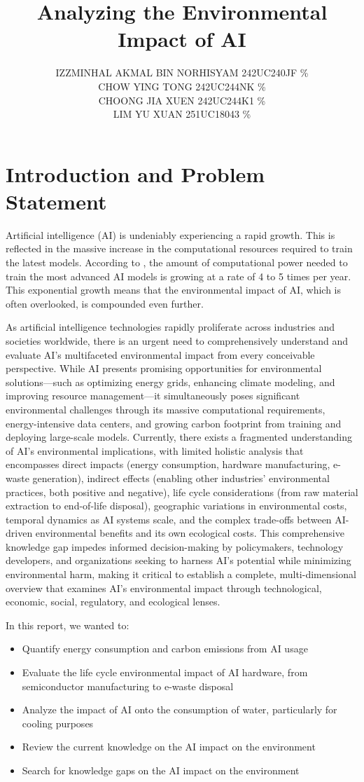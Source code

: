 \documentclass[a4paper, 12pt]{article}
\author{
IZZMINHAL AKMAL BIN NORHISYAM \quad 242UC240JF \quad 25\% \\
CHOW YING TONG \quad 242UC244NK \quad 25\% \\
CHOONG JIA XUEN \quad 242UC244K1 \quad 25\% \\
LIM YU XUAN \quad 251UC18043 \quad 25\% \\
}
\title{ Analyzing the Environmental Impact of AI  }
\begin{document}
\maketitle

\section{Introduction and Problem Statement}
Artificial intelligence (AI) is undeniably experiencing a rapid growth. This is reflected in the massive increase in the computational resources required to train the latest models. According to \citet{Sevilla_Roldan_2024}, the amount of computational power needed to train the most advanced AI models is growing at a rate of 4 to 5 times per year. This exponential growth means that the environmental impact of AI, which is often overlooked, is compounded even further.

As artificial intelligence technologies rapidly proliferate across industries and societies worldwide, there is an urgent need to comprehensively understand and evaluate AI's multifaceted environmental impact from every conceivable perspective. While AI presents promising opportunities for environmental solutions—such as optimizing energy grids, enhancing climate modeling, and improving resource management—it simultaneously poses significant environmental challenges through its massive computational requirements, energy-intensive data centers, and growing carbon footprint from training and deploying large-scale models. Currently, there exists a fragmented understanding of AI's environmental implications, with limited holistic analysis that encompasses direct impacts (energy consumption, hardware manufacturing, e-waste generation), indirect effects (enabling other industries' environmental practices, both positive and negative), life cycle considerations (from raw material extraction to end-of-life disposal), geographic variations in environmental costs, temporal dynamics as AI systems scale, and the complex trade-offs between AI-driven environmental benefits and its own ecological costs. This comprehensive knowledge gap impedes informed decision-making by policymakers, technology developers, and organizations seeking to harness AI's potential while minimizing environmental harm, making it critical to establish a complete, multi-dimensional overview that examines AI's environmental impact through technological, economic, social, regulatory, and ecological lenses.

In this report, we wanted to:
\begin{itemize}
    \item Quantify energy consumption and carbon emissions from AI usage
    \item Evaluate the life cycle environmental impact of AI hardware, from semiconductor manufacturing to e-waste disposal
    \item Analyze the impact of AI onto the consumption of water, particularly for cooling purposes
    \item Review the current knowledge on the AI impact on the environment
    \item Search for knowledge gaps on the AI impact on the environment
\end{itemize}
\end{document}
